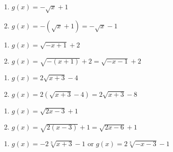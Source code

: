 \begin{multicols}{2}
\begin{enumerate}
\setcounter{enumi}{\value{HW}}

\item  $g(x) = -\sqrt{x} + 1$
\item  $g(x) = -(\sqrt{x} + 1) = -\sqrt{x} - 1$

\setcounter{HW}{\value{enumi}}
\end{enumerate}
\end{multicols}

\begin{multicols}{2}
\begin{enumerate}
\setcounter{enumi}{\value{HW}}

\item  $g(x) = \sqrt{-x+1} + 2$
\item  $g(x) = \sqrt{-(x+1)} + 2 = \sqrt{-x-1} + 2$

\setcounter{HW}{\value{enumi}}
\end{enumerate}
\end{multicols}

\begin{multicols}{2}
\begin{enumerate}
\setcounter{enumi}{\value{HW}}

\item  $g(x) = 2\sqrt{x+3} - 4$
\item  $g(x) = 2\left(\sqrt{x+3} - 4\right) = 2\sqrt{x+3} - 8$

\setcounter{HW}{\value{enumi}}
\end{enumerate}
\end{multicols}

\begin{multicols}{2}
\begin{enumerate}
\setcounter{enumi}{\value{HW}}

\item  $g(x) = \sqrt{2x-3} + 1$
\item  $g(x) = \sqrt{2(x-3)} + 1 = \sqrt{2x-6}+1$

\setcounter{HW}{\value{enumi}}
\end{enumerate}
\end{multicols}

\begin{enumerate}
\setcounter{enumi}{\value{HW}}

\item $g(x) = -2\sqrt[3]{x + 3} - 1$ or $g(x) = 2\sqrt[3]{-x - 3} - 1$

\setcounter{HW}{\value{enumi}}
\end{enumerate}

\closegraphsfile